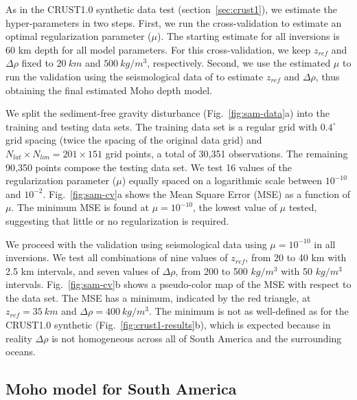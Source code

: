 \documentclass[extra,mreferee]{gji}
\begin{document}
As in the CRUST1.0 synthetic data test (section~\ref{sec:crust1}),
we estimate the hyper-parameters in two steps.
First, we run the cross-validation to estimate
an optimal regularization parameter ($\mu$).
The starting estimate for all inversions is
60 km depth for all model parameters.
For this cross-validation,
we keep $z_{ref}$ and $\Delta\rho$ fixed to
$20\ km$ and $500\ kg/m^3$, respectively.
Second, we use the estimated $\mu$ to run the validation
using the seismological data of \citet{assumpcao2013a}
to estimate $z_{ref}$ and $\Delta\rho$,
thus obtaining the final estimated Moho depth model.

We split the sediment-free gravity disturbance (Fig.~\ref{fig:sam-data}a) into
the training and testing data sets.
The training data set is a regular grid with $0.4^\circ$ grid spacing
(twice the spacing of the original data grid)
and $N_{lat} \times N_{lon} = 201 \times 151$ grid points,
a total of 30,351 observations.
The remaining 90,350 points compose the testing data set.
We test 16 values of the regularization parameter ($\mu$)
equally spaced on a logarithmic scale between $10^{-10}$ and $10^{-2}$.
Fig.~\ref{fig:sam-cv}a shows the Mean Square Error (MSE)
as a function of $\mu$.
The minimum MSE is found at $\mu = 10^{-10}$, the lowest value of $\mu$ tested,
suggesting that little or no regularization is required.

We proceed with the validation using seismological data
using $\mu = 10^{-10}$ in all inversions.
We test all combinations of
nine values of $z_{ref}$, from 20 to 40 km with 2.5 km intervals,
and seven values of $\Delta\rho$, from 200 to 500 $kg/m^3$
with 50 $kg/m^3$ intervals.
Fig.~\ref{fig:sam-cv}b shows a pseudo-color map of the MSE
with respect to the \citet{assumpcao2013a} data set.
The MSE has a minimum, indicated by the red triangle,
at $z_{ref} = 35\ km$ and $\Delta\rho = 400\ kg/m^3$.
The minimum is not as well-defined as for the CRUST1.0 synthetic
(Fig.~\ref{fig:crust1-results}b),
which is expected because in reality $\Delta\rho$ is not homogeneous across all
of South America and the surrounding oceans.

\subsection{Moho model for South America}
\end{document}

